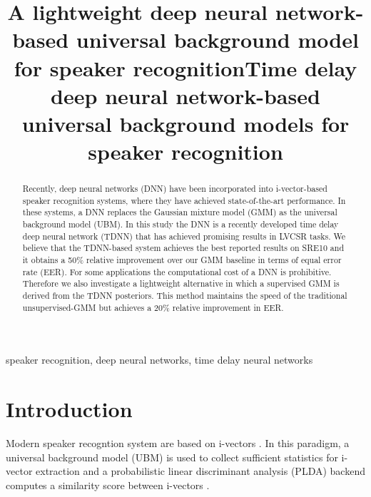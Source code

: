 \documentclass{article}
\title{A lightweight deep neural network-based universal background model for speaker recognition}
\title{Time delay deep neural network-based universal background models for speaker recognition}
\begin{document}
%
\maketitle
%
\begin{abstract}

Recently, deep neural networks (DNN) have been incorporated into i-vector-based speaker
recognition systems, where they have achieved state-of-the-art performance. In these
systems, a DNN replaces the Gaussian mixture model (GMM) as the universal background
model (UBM). In this study the DNN is a recently developed time delay deep neural network
(TDNN) that has achieved promising results in LVCSR tasks. 
We believe that the
TDNN-based system achieves the best reported results on SRE10 and it obtains a 50\% relative 
improvement over our GMM baseline in terms of equal error rate (EER). 
For some applications the computational cost of a DNN is prohibitive. 
Therefore we also investigate a lightweight alternative in which a supervised GMM is derived from
the TDNN posteriors. This method maintains the speed of the traditional unsupervised-GMM
but achieves a 20\% relative improvement in EER.
\end{abstract}
%
\begin{keywords}
speaker recognition, deep neural networks, time delay neural networks
\end{keywords}
%
\section{Introduction}
\label{sec:intro}

Modern speaker recogntion system are based on i-vectors \cite{ivector}.
In this paradigm, a universal background model (UBM) is used to collect
sufficient statistics for i-vector extraction and a probabilistic 
linear discriminant analysis (PLDA) backend computes a similarity score between i-vectors
 \cite{plda_prince, brummer2010speaker, kenny2010bayesian, villalba2011towards, garcia2011analysis, garcia2012multicondition}.
\end{document}
